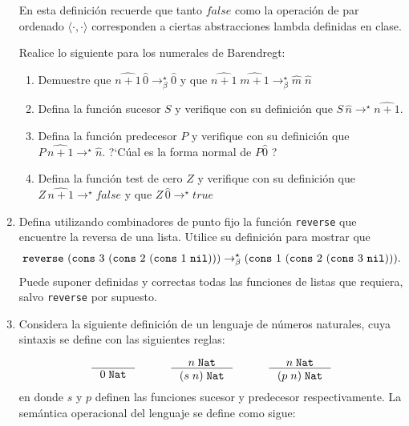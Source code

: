 \documentclass{article}
\begin{document}
\begin{enumerate}
        En esta definición recuerde que tanto $false$ como la operación de par ordenado $\langle\cdot,\cdot\rangle$ corresponden a ciertas abstracciones lambda definidas en clase.

        \medskip

        Realice lo siguiente para los numerales de Barendregt:

        \begin{enumerate}
            \item Demuestre que $\widehat{n+1}\,\widehat{0}\to^\star_\beta \widehat{0}$ y que $\widehat{n+1}\;\widehat{m+1}\to^\star_\beta \widehat{m}\;\widehat{n}$
            \item Defina la función sucesor $S$ y verifique con su definición que $S\,\widehat{n}\to^\star \widehat{n+1}$.
            \item Defina la función predecesor $P$ y verifique con su definición que $P\,\widehat{n+1}\to^\star \widehat{n}$. ?`Cúal es la forma normal de $P\widehat{0}$ ?
            \item Defina la función test de cero $Z$  y verifique con su definición que $Z\,\widehat{n+1}\to^\star false$ y que $Z\,\widehat{0}\to^\star true$
        \end{enumerate}

        \item Defina utilizando combinadores de punto fijo la función {\tt reverse} que encuentre la reversa de una lista. Utilice su definición para mostrar que $${\tt reverse}\,\, ({\tt cons}\,\, 3\,\, ({\tt cons}\,\, 2\,\, ({\tt cons}\,\, 1\,\, {\tt nil}))) \to^\star_\beta ({\tt cons}\,\, 1\,\, ({\tt cons}\,\, 2\,\, ({\tt cons}\,\, 3\,\, {\tt nil}))).$$ Puede suponer definidas y correctas todas las funciones de listas que requiera, salvo {\tt reverse} por supuesto.

        \item Considera la siguiente definición de un lenguaje de números naturales, cuya sintaxis se define con las siguientes reglas:

         \[
        \begin{array}{ccccc}
            \inference{}{0\;\tt{Nat}}&
            \quad&
            \inference{n\;\tt{Nat}}{(s\;n)\;\tt{Nat}}&
            \quad&
            \inference{n\;\tt{Nat}}{(p\;n)\;\tt{Nat}}
        \end{array}
        \]
        \noindent
        en donde $s$ y $p$ definen las funciones sucesor y predecesor respectivamente. La semántica operacional del lenguaje se define como sigue:


\end{enumerate}
\end{document}
